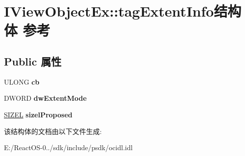 \hypertarget{struct_i_view_object_ex_1_1tag_extent_info}{}\section{I\+View\+Object\+Ex\+:\+:tag\+Extent\+Info结构体 参考}
\label{struct_i_view_object_ex_1_1tag_extent_info}
\subsection*{Public 属性}
\begin{DoxyCompactItemize}
\item 
\mbox{\label{struct_i_view_object_ex_1_1tag_extent_info_a1dc9f6f5e6e97ca52b779beff1d4e3bf}} 
U\+L\+O\+NG {\bfseries cb}
\item 
\mbox{\label{struct_i_view_object_ex_1_1tag_extent_info_a57159d596bfb9a2571780940733df3c9}} 
D\+W\+O\+RD {\bfseries dw\+Extent\+Mode}
\item 
\mbox{\label{struct_i_view_object_ex_1_1tag_extent_info_a64267fa2911b49b4ff0ee464bb1bb32f}} 
\hyperlink{structtag_s_i_z_e}{S\+I\+Z\+EL} {\bfseries sizel\+Proposed}
\end{DoxyCompactItemize}


该结构体的文档由以下文件生成\+:\begin{DoxyCompactItemize}
\item 
E\+:/\+React\+O\+S-\/0../sdk/include/psdk/ocidl.\+idl\end{DoxyCompactItemize}

